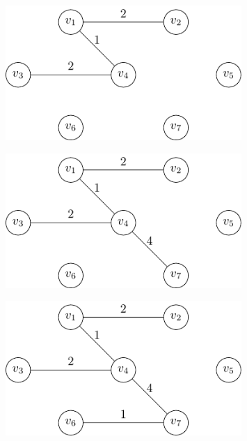 \begin{minipage}{0.25\textwidth}
\begin{figure}[H]
  \centering
  \includegraphics[width=0.8\textwidth]{Figure/prim_algo_d4.pdf}
\end{figure}
\end{minipage}
\begin{minipage}{0.25\textwidth}
\begin{figure}[H]
  \centering
  \includegraphics[width=0.8\textwidth]{Figure/prim_algo_d5.pdf}
\end{figure}
\end{minipage}
\begin{minipage}{0.25\textwidth}
\begin{figure}[H]
  \centering
  \includegraphics[width=0.8\textwidth]{Figure/prim_algo_d6.pdf}
\end{figure}
\end{minipage}

